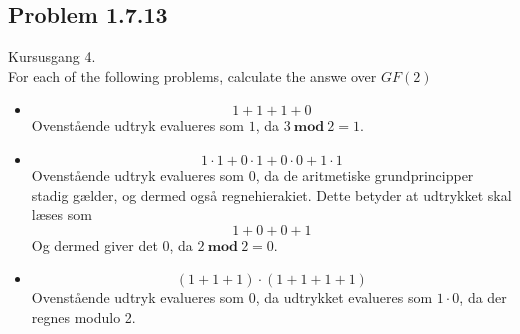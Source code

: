 \subsection{Problem 1.7.13}
Kursusgang 4.\\
For each of the following problems, calculate the answe over $GF(2)$
\begin{itemize}
    \item \begin{equation}
        1+1+1+0
    \end{equation}
    Ovenstående udtryk evalueres som $1$, da $3\:\mathbf{mod}\:2=1$.
    \item \begin{equation}
        1\cdot1+0\cdot1+0\cdot0+1\cdot1
    \end{equation}
    Ovenstående udtryk evalueres som $0$, da de aritmetiske grundprincipper stadig gælder, og dermed også regnehierakiet.
    Dette betyder at udtrykket skal læses som
    \begin{equation}
        1+0+0+1
    \end{equation}
    Og dermed giver det $0$, da $2\:\mathbf{mod}\:2=0$.
    \item \begin{equation}
        (1+1+1)\cdot(1+1+1+1)
    \end{equation}
    Ovenstående udtryk evalueres som $0$, da udtrykket evalueres som $1\cdot0$, da der regnes modulo 2.
\end{itemize}